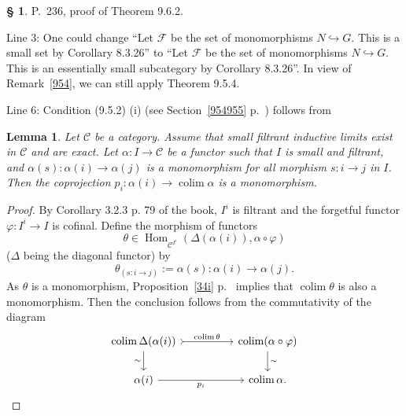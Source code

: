 \documentclass[12pt]{article}%
\newtheorem{lem}[thm]{Lemma}
\theoremstyle{remark}
\theoremstyle{definition}
\newtheorem{s}[thm]{\S}%
\newcommand{\cc}{\mathcal}
\newcommand{\C}{\mathcal C}
\newcommand{\pp}{\varphi}
\newcommand{\incl}{\hookrightarrow}
\DeclareMathOperator*{\colim}{colim}%
\DeclareMathOperator{\Hom}{Hom}%
\begin{document}
\begin{s}\label{962}
P.~236, proof of Theorem 9.6.2. 

Line 3: One could change ``Let $\cc F$ be the set of monomorphisms $N\incl G$. This is a small set by Corollary 8.3.26'' to ``Let $\cc F$ be the set of monomorphisms $N\incl G$. This is an essentially small subcategory by Corollary 8.3.26''. In view of Remark~\ref{954}, we can still apply Theorem 9.5.4.

Line 6: Condition (9.5.2) (i) (see Section~\ref{954955} p.~\pageref{954955}) follows from 
%
\begin{lem}\label{952i}
Let $\C$ be a category. Assume that small filtrant inductive limits exist in $\C$ and are exact. Let $\alpha:I\to\C$ be a functor such that $I$ is small and filtrant, and $\alpha(s):\alpha(i)\to\alpha(j)$ is a monomorphism for all morphism $s:i\to j$ in $I$. Then the coprojection $p_i:\alpha(i)\to\colim\alpha$ is a monomorphism.
\end{lem}
%
\begin{proof}
By Corollary 3.2.3 p. 79 of the book, $I^i$ is filtrant and the forgetful functor $\pp:I^i\to I$ is cofinal. Define the morphism of functors 
$$
\theta\in\Hom_{\C^{I^i}}(\Delta(\alpha(i)),\alpha\circ\pp)
$$ 
($\Delta$ being the diagonal functor) by 
$$
\theta_{(s:i\to j)}:=\alpha(s):\alpha(i)\to\alpha(j). 
$$ 
As $\theta$ is a monomorphism, Proposition~\ref{34i} p.~\pageref{34i} implies that $\colim\theta$ is also a monomorphism. Then the conclusion follows from the commutativity of the diagram 
$$
\begin{tikzcd}
\colim\Delta(\alpha(i))\ar{d}[swap]{\sim}\ar[tail]{rr}{\colim\theta}&&\colim(\alpha\circ\pp)\ar{d}{\sim}\\ 
\alpha(i)\ar{rr}[swap]{p_i}&&\colim\alpha.
\end{tikzcd}
$$
\end{proof}
\end{s}

\end{document}
